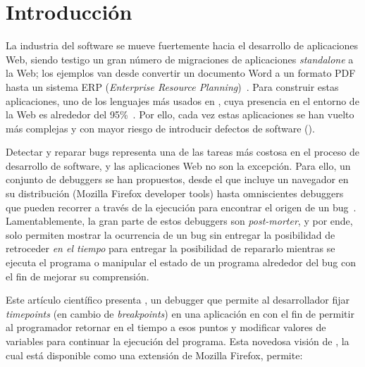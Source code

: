 \documentclass[conference]{IEEEtran}
\begin{document}
\section{Introducci\'on}
\label{sec:intro}

La industria del software se mueve fuertemente hacia el desarrollo de aplicaciones Web, siendo testigo un gran n\'umero de migraciones de aplicaciones {\em standalone} a la Web; los ejemplos van desde convertir un documento Word a un formato PDF~\cite{smallpdf} hasta un sistema ERP ({\em Enterprise Resource Planning})~\cite{erpOrcale}. Para construir estas aplicaciones, uno de los lenguajes m\'as usados en \javascript, cuya presencia en el entorno de la Web es alrededor del 95\%~\cite{jsuses}. Por ello, cada vez estas aplicaciones se han vuelto m\'as complejas y con mayor riesgo de introducir defectos de software (). 

Detectar y reparar bugs representa una de las tareas m\'as costosa en el proceso de desarrollo de software, y las aplicaciones Web no son la excepci\'on. Para ello, un conjunto de debuggers se han propuestos, desde el que incluye un navegador en su distribuci\'on (\eg Mozilla Firefox developer tools) hasta omniscientes debuggers que pueden recorrer a trav\'es de la ejecuci\'on para encontrar el origen de un bug~\cite{azar:2016,barrAl:fse2016}. Lamentablemente, la gran parte de estos debuggers son {\em post-morter}, y por ende, solo permiten mostrar la ocurrencia de un bug sin entregar la posibilidad de retroceder {\em en el tiempo} para entregar la posibilidad de repararlo mientras se ejecuta el programa o manipular el estado de un programa alrededor del bug con el fin de mejorar su comprensi\'on.       

Este art\'iculo cient\'ifico presenta \deloreanjs, un debugger que permite al desarrollador fijar {\em timepoints} (en cambio de {\em breakpoints}) en una aplicaci\'on en \javascript con el fin de permitir al programador retornar en el tiempo a esos puntos y modificar valores de variables para continuar la ejecuci\'on del programa. Esta novedosa visi\'on de \deloreanjs, la cual est\'a disponible como una extensi\'on de Mozilla Firefox, permite:    
\end{document}
